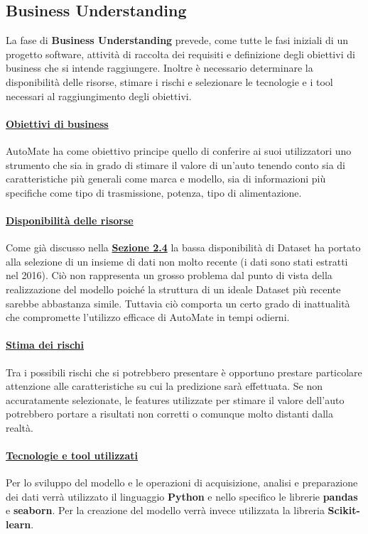 \subsection{Business Understanding}
La fase di \textbf{Business Understanding} prevede, come tutte le fasi iniziali di un progetto software, attività di raccolta dei requisiti e definizione degli obiettivi di business che si intende raggiungere. Inoltre è necessario determinare la disponibilità delle risorse, stimare i rischi e selezionare le tecnologie e i tool necessari al raggiungimento degli obiettivi.

\paragraph{\textcolor[HTML]{000099}{\underline{Obiettivi di business}}}
AutoMate ha come obiettivo principe quello di conferire ai suoi utilizzatori uno strumento che sia in grado di stimare il valore di un'auto tenendo conto sia di caratteristiche più generali come marca e modello, sia di informazioni più specifiche come tipo di trasmissione, potenza, tipo di alimentazione.

\paragraph{\textcolor[HTML]{000099}{\underline{Disponibilità delle risorse}}}
Come già discusso nella \hyperref[sec:problematicheDataset]{\textbf{Sezione 2.4}}
la bassa disponibilità di Dataset ha portato alla selezione di un insieme di dati non molto recente (i dati sono stati estratti nel 2016). Ciò non rappresenta un grosso problema dal punto di vista della realizzazione del modello poiché la struttura di un ideale Dataset più recente sarebbe abbastanza simile. Tuttavia ciò comporta un certo grado di inattualità che compromette l'utilizzo efficace di AutoMate in tempi odierni.

\paragraph{\textcolor[HTML]{000099}{\underline{Stima dei rischi}}}
Tra i possibili rischi che si potrebbero presentare è opportuno prestare particolare attenzione alle caratteristiche su cui la predizione sarà effettuata. Se non accuratamente selezionate, le features utilizzate per stimare il valore dell'auto potrebbero portare a risultati non corretti o comunque molto distanti dalla realtà.

\paragraph{\textcolor[HTML]{000099}{\underline{Tecnologie e tool utilizzati}}}
Per lo sviluppo del modello e le operazioni di acquisizione, analisi e preparazione dei dati verrà utilizzato il linguaggio \textbf{Python} e nello specifico le librerie \textbf{pandas} e \textbf{seaborn}. Per la creazione del modello verrà invece utilizzata la libreria \textbf{Scikit-learn}.
\pagebreak


